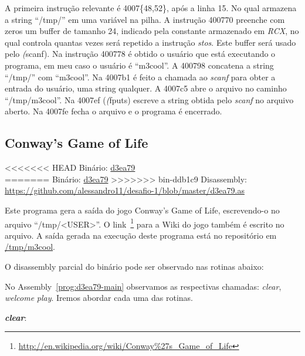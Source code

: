 A primeira instrução relevante é 4007\{48,52\}, após a linha 15. No qual
armazena a string ``/tmp/'' em uma variável na pilha. A instrução
400770 preenche com zeros um buffer de tamanho 24, indicado pela
constante armazenado em \emph{RCX}, no qual controla quantas vezes será
repetido a instrução \emph{stos}. Este buffer será usado pelo
\emph(scanf). Na instrução 400778 é obtido o usuário que está
executando o programa, em meu caso o usuário é ``m3cool''. A 400798
concatena a string ``/tmp/'' com ``m3cool''. Na 4007b1 é feito a
chamada ao \emph{scanf} para obter a entrada do usuário, uma string
qualquer. A 4007c5 abre o arquivo no caminho ``/tmp/m3cool''. Na
4007ef (\emph(fputs) escreve a string obtida pelo \emph{scanf} no
arquivo aberto. Na 4007fe fecha o arquivo e o programa é encerrado.


\subsection{Conway's Game of Life}
<<<<<<< HEAD
\noindent Binário: \href{https://s3.amazonaws.com/chaordic-desafio-cloud/d3ea79}{d3ea79}\\
=======
Binário: \href{https://s3.amazonaws.com/chaordic-desafio-cloud/d3ea79}{d3ea79}
>>>>>>> bin-ddb1c9
Disassembly: \href{https://github.com/alessandro11/desafio-1/blob/master/d3ea79.as}{https://github.com/alessandro11/desafio-1/blob/master/d3ea79.as}

Este programa gera a saída do jogo Conway's Game of Life,
escrevendo-o no arquivo ``/tmp/<USER>''. O
link~\footnote{\href{http://en.wikipedia.org/wiki/Conway\%27s\_Game\_of\_Life}{http://en.wikipedia.org/wiki/Conway\%27s\_Game\_of\_Life}}
para a Wiki do jogo também é escrito no arquivo. A saída gerada na
execução deste programa está no repositório em
\href{https://github.com/alessandro11/desafio-1/blob/master/m3cool}{/tmp/m3cool}.

O disassembly parcial do binário pode ser observado nas rotinas abaixo:



No Assembly~\ref{prog:d3ea79-main} observamos as respectivas chamadas:
\emph{clear}, \emph{welcome} \emph{play}. Iremos abordar cada uma das rotinas.\\

\par\textbf{\emph{clear}}:


